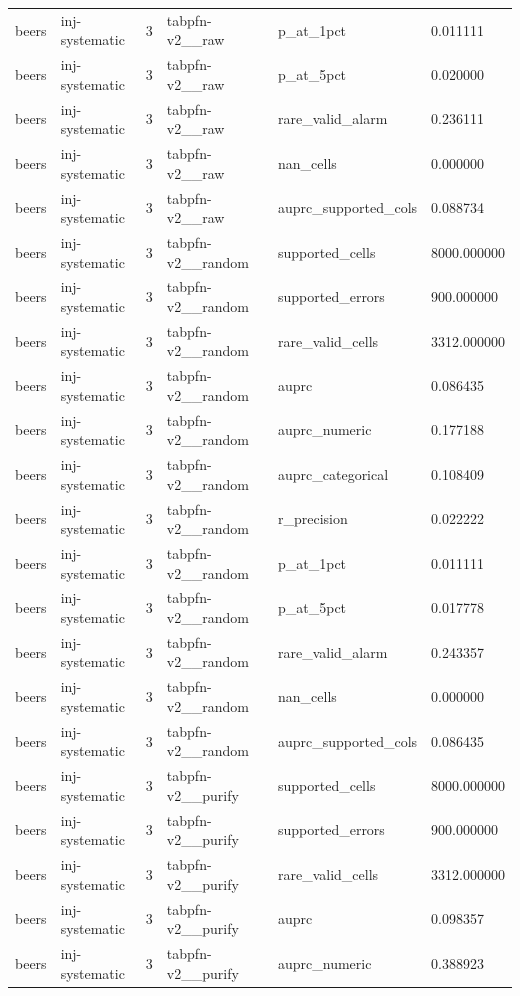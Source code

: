 \begin{tabular}{llllll}
beers & inj-systematic & 3 & tabpfn-v2\_\_raw & p\_at\_1pct & 0.011111 \\
beers & inj-systematic & 3 & tabpfn-v2\_\_raw & p\_at\_5pct & 0.020000 \\
beers & inj-systematic & 3 & tabpfn-v2\_\_raw & rare\_valid\_alarm & 0.236111 \\
beers & inj-systematic & 3 & tabpfn-v2\_\_raw & nan\_cells & 0.000000 \\
beers & inj-systematic & 3 & tabpfn-v2\_\_raw & auprc\_supported\_cols & 0.088734 \\
beers & inj-systematic & 3 & tabpfn-v2\_\_random & supported\_cells & 8000.000000 \\
beers & inj-systematic & 3 & tabpfn-v2\_\_random & supported\_errors & 900.000000 \\
beers & inj-systematic & 3 & tabpfn-v2\_\_random & rare\_valid\_cells & 3312.000000 \\
beers & inj-systematic & 3 & tabpfn-v2\_\_random & auprc & 0.086435 \\
beers & inj-systematic & 3 & tabpfn-v2\_\_random & auprc\_numeric & 0.177188 \\
beers & inj-systematic & 3 & tabpfn-v2\_\_random & auprc\_categorical & 0.108409 \\
beers & inj-systematic & 3 & tabpfn-v2\_\_random & r\_precision & 0.022222 \\
beers & inj-systematic & 3 & tabpfn-v2\_\_random & p\_at\_1pct & 0.011111 \\
beers & inj-systematic & 3 & tabpfn-v2\_\_random & p\_at\_5pct & 0.017778 \\
beers & inj-systematic & 3 & tabpfn-v2\_\_random & rare\_valid\_alarm & 0.243357 \\
beers & inj-systematic & 3 & tabpfn-v2\_\_random & nan\_cells & 0.000000 \\
beers & inj-systematic & 3 & tabpfn-v2\_\_random & auprc\_supported\_cols & 0.086435 \\
beers & inj-systematic & 3 & tabpfn-v2\_\_purify & supported\_cells & 8000.000000 \\
beers & inj-systematic & 3 & tabpfn-v2\_\_purify & supported\_errors & 900.000000 \\
beers & inj-systematic & 3 & tabpfn-v2\_\_purify & rare\_valid\_cells & 3312.000000 \\
beers & inj-systematic & 3 & tabpfn-v2\_\_purify & auprc & 0.098357 \\
beers & inj-systematic & 3 & tabpfn-v2\_\_purify & auprc\_numeric & 0.388923 \\

\end{tabular}
